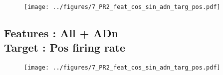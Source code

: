 \documentclass[10pt,a4paper]{article}
\begin{document}
\begin{figure}[htbp]
	\begin{center}
		\texttt{[image: ../figures/7\_PR2\_feat\_cos\_sin\_adn\_targ\_pos.pdf]} 
	\end{center}
\end{figure}

\subsection{Features : All + ADn \\ Target : Pos firing rate}

\begin{figure}[htbp]
	\begin{center}
		\texttt{[image: ../figures/7\_PR2\_feat\_cos\_sin\_adn\_targ\_pos.pdf]} 
	\end{center}
\end{figure}
\end{document}
